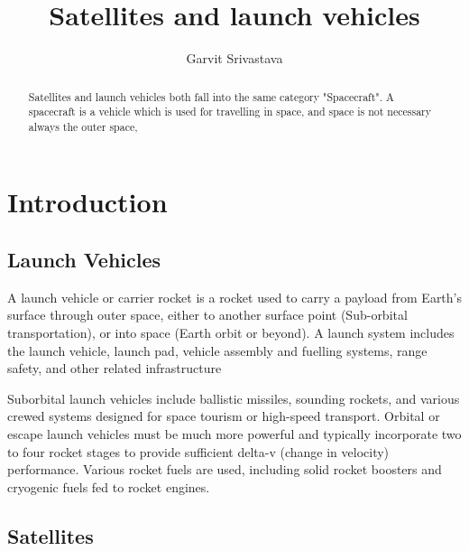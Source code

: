 \documentclass{article}
\title{Satellites and launch vehicles}
\author{Garvit Srivastava}
\begin{document}
\maketitle
\begin{abstract}
    Satellites and launch vehicles both fall into the same category     "Spacecraft". A spacecraft is a vehicle which is used for travelling in space, and space is not necessary always the outer space, 
\end{abstract}
\section{Introduction}
\subsection{Launch Vehicles}
A launch vehicle or carrier rocket is a rocket used to carry a payload from Earth's surface through outer space, either to another surface point (Sub-orbital transportation), or into space (Earth orbit or beyond). A launch system includes the launch vehicle, launch pad, vehicle assembly and fuelling systems, range safety, and other related infrastructure

Suborbital launch vehicles include ballistic missiles, sounding rockets, and various crewed systems designed for space tourism or high-speed transport. Orbital or escape launch vehicles must be much more powerful and typically incorporate two to four rocket stages to provide sufficient delta-v (change in velocity) performance. Various rocket fuels are used, including solid rocket boosters and cryogenic fuels fed to rocket engines.
\subsection{Satellites}
\end{document}
